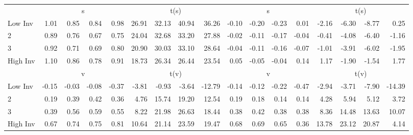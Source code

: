 \begin{table}[!ht]
\begin{tabular}{lrrrrrrrrrrrrrrrr}
  
    
      & \multicolumn{4}{c}{s} & \multicolumn{4}{c}{t(s)}
    
      & \multicolumn{4}{c}{s} & \multicolumn{4}{c}{t(s)}
    
    \\
      \cmidrule(r){2-5} \cmidrule(r){6-9} \cmidrule(r){10-13} \cmidrule(r){14-17}

    Low Inv   & 1.01  & 0.85  & 0.84  & 0.98  & 26.91  & 32.13  & 40.94  & 36.26  & -0.10  & -0.20  & -0.23  & 0.01  & -2.16  & -6.30  & -8.77  & 0.25  \\
           2  & 0.89  & 0.76  & 0.67  & 0.75  & 24.04  & 32.68  & 33.20  & 27.88  & -0.02  & -0.11  & -0.17  & -0.04  & -0.41  & -4.08  & -6.40  & -1.16  \\
           3  & 0.92  & 0.71  & 0.69  & 0.80  & 20.90  & 30.03  & 33.10  & 28.64  & -0.04  & -0.11  & -0.16  & -0.07  & -1.01  & -3.91  & -6.02  & -1.95  \\
    High Inv  & 1.10  & 0.86  & 0.78  & 0.91  & 18.73  & 26.34  & 26.44  & 23.54  & 0.05  & -0.05  & -0.04  & 0.14  & 1.17  & -1.90  & -1.54  & 1.77  \\

  
    
      & \multicolumn{4}{c}{v} & \multicolumn{4}{c}{t(v)}
    
      & \multicolumn{4}{c}{v} & \multicolumn{4}{c}{t(v)}
    
    \\
      \cmidrule(r){2-5} \cmidrule(r){6-9} \cmidrule(r){10-13} \cmidrule(r){14-17}

    Low Inv   & -0.15  & -0.03  & -0.08  & -0.37  & -3.81  & -0.93  & -3.64  & -12.79  & -0.14  & -0.12  & -0.22  & -0.47  & -2.94  & -3.71  & -7.90  & -14.39  \\
           2  & 0.19  & 0.39  & 0.42  & 0.36  & 4.76  & 15.74  & 19.20  & 12.54  & 0.19  & 0.18  & 0.14  & 0.14  & 4.28  & 5.94  & 5.12  & 3.72  \\
           3  & 0.39  & 0.56  & 0.59  & 0.55  & 8.22  & 21.98  & 26.63  & 18.44  & 0.38  & 0.42  & 0.38  & 0.38  & 8.36  & 14.48  & 13.63  & 10.07  \\
    High Inv  & 0.67  & 0.74  & 0.75  & 0.81  & 10.64  & 21.14  & 23.59  & 19.47  & 0.68  & 0.69  & 0.65  & 0.36  & 13.78  & 23.12  & 20.87  & 4.14  \\

  

  \bottomrule
\end{tabular}
\label{tbl:32_Size_BMm_Prior_F93}
\end{table}